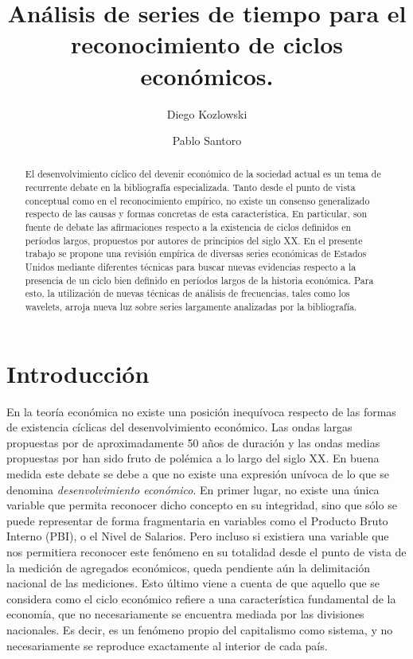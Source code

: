 \documentclass[a4paper]{article}
\title{Análisis de series de tiempo para el reconocimiento de ciclos económicos.}
\author[1]{Diego Kozlowski}
\author[2]{Pablo Santoro}
\affil[1,2]{Maestr\'ia en Data Mining \& Knowledge Discovery, FCEN-UBA}
\affil[1]{diegokoz92@gmail.com}
\affil[2]{pablorsantoro@gmail.com}
\date{}                     %
\begin{document}
\maketitle

\begin{abstract}
	
	El desenvolvimiento cíclico del devenir económico de la sociedad actual es un tema de recurrente debate en la bibliografía especializada. Tanto desde el punto de vista conceptual como en el reconocimiento empírico, no existe un consenso generalizado respecto de las causas y formas concretas de esta característica. En particular, son fuente de debate las afirmaciones respecto a la existencia de ciclos definidos en períodos largos, propuestos por autores de principios del siglo XX. En el presente trabajo se propone una revisión empírica de diversas series económicas de Estados Unidos mediante diferentes técnicas para buscar nuevas evidencias respecto a la presencia de un ciclo bien definido en períodos largos de la historia económica. Para esto, la utilización de nuevas técnicas de análisis de frecuencias, tales como los wavelets, arroja nueva luz sobre series largamente analizadas por la bibliografía.
\end{abstract}

\section{Introducción}

En la teoría económica no existe una posición inequívoca respecto de las formas de existencia cíclicas del desenvolvimiento económico. Las ondas largas propuestas por \cite{kondratieff1979long} de aproximadamente 50 años de duración y las ondas medias propuestas por \cite{kuznets1930secular} han sido fruto de polémica a lo largo del siglo XX. En buena medida este debate se debe a que no existe una expresión unívoca de lo que se denomina \textit{desenvolvimiento económico}. En primer lugar, no existe una única variable que permita reconocer dicho concepto en su integridad, sino que sólo se puede representar de forma fragmentaria en variables como el Producto Bruto Interno (PBI), o el Nivel de Salarios. Pero incluso si existiera una variable que nos permitiera reconocer este fenómeno en su totalidad desde el punto de vista de la medición de agregados económicos, queda pendiente aún la delimitación nacional de las mediciones. Esto último viene a cuenta de que aquello que se considera como el ciclo económico refiere a una característica fundamental de la economía, que no necesariamente se encuentra mediada por las divisiones nacionales. Es decir, es un fenómeno propio del capitalismo como sistema, y no necesariamente se reproduce exactamente al interior de cada país. 
\end{document}
